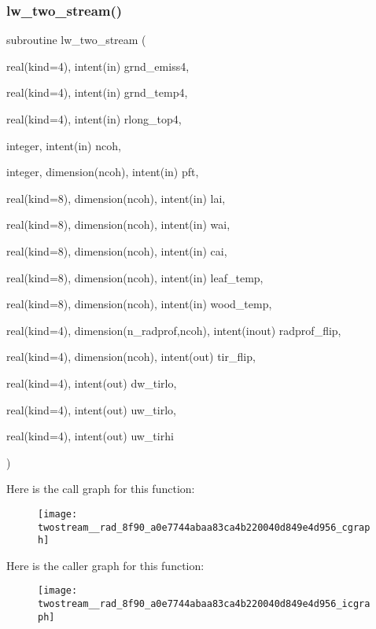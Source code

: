 \subsubsection{\texorpdfstring{lw\+\_\+two\+\_\+stream()}{lw\_two\_stream()}}
{\footnotesize\ttfamily subroutine lw\+\_\+two\+\_\+stream (\begin{DoxyParamCaption}\item[{real(kind=4), intent(in)}]{grnd\+\_\+emiss4,  }\item[{real(kind=4), intent(in)}]{grnd\+\_\+temp4,  }\item[{real(kind=4), intent(in)}]{rlong\+\_\+top4,  }\item[{integer, intent(in)}]{ncoh,  }\item[{integer, dimension(ncoh), intent(in)}]{pft,  }\item[{real(kind=8), dimension(ncoh), intent(in)}]{lai,  }\item[{real(kind=8), dimension(ncoh), intent(in)}]{wai,  }\item[{real(kind=8), dimension(ncoh), intent(in)}]{cai,  }\item[{real(kind=8), dimension(ncoh), intent(in)}]{leaf\+\_\+temp,  }\item[{real(kind=8), dimension(ncoh), intent(in)}]{wood\+\_\+temp,  }\item[{real(kind=4), dimension(n\+\_\+radprof,ncoh), intent(inout)}]{radprof\+\_\+flip,  }\item[{real(kind=4), dimension(ncoh), intent(out)}]{tir\+\_\+flip,  }\item[{real(kind=4), intent(out)}]{dw\+\_\+tirlo,  }\item[{real(kind=4), intent(out)}]{uw\+\_\+tirlo,  }\item[{real(kind=4), intent(out)}]{uw\+\_\+tirhi }\end{DoxyParamCaption})}

Here is the call graph for this function\+:
\nopagebreak
\begin{figure}[H]
\begin{center}
\leavevmode
\texttt{[image: twostream\_\_rad\_8f90\_a0e7744abaa83ca4b220040d849e4d956\_cgraph]}
\end{center}
\end{figure}
Here is the caller graph for this function\+:
\nopagebreak
\begin{figure}[H]
\begin{center}
\leavevmode
\texttt{[image: twostream\_\_rad\_8f90\_a0e7744abaa83ca4b220040d849e4d956\_icgraph]}
\end{center}
\end{figure}
\mbox{\label{twostream__rad_8f90_aafe0629c5d8ddcd6eb9a8bb208534489}} 
